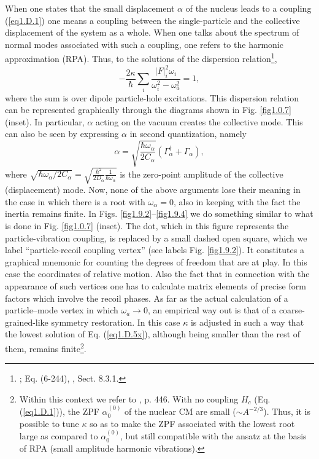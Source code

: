 \begin{subappendices}
When one states that the small displacement 
$\alpha$ of the nucleus leads to a coupling (\ref{eq1.D.1}) one means a coupling between the
single-particle and the collective displacement of the system as a whole. When one talks about the spectrum of normal modes 
associated  with such a coupling, one refers to the harmonic approximation (RPA). Thus, to the solutions of the dispersion relation\footnote{\cite{Bohr:75}; Eq. (6-244), \cite{Brink:05}, Sect. 8.3.1.},
\begin{equation}\label{eq1.D.5x}
- \frac{2 \kappa}{\hbar} \sum_i \frac{|F|_i^2 \omega_i}{\omega_i^2 - \omega_a^2} = 1,
\end{equation}
where the sum is over  dipole particle-hole excitations. This dispersion relation can be represented graphically 
through the diagrams shown in Fig. \ref{fig1.0.7} (inset). In particular, 
$\alpha$ acting on the vacuum creates the collective mode. This can also be seen by expressing $\alpha$ in second quantization, namely
\begin{equation}
\alpha = \sqrt { \frac{\hbar \omega_{\alpha}}{2C_{\alpha}} }
 (\Gamma_{\alpha}^{\dagger} + \Gamma_{\alpha}),
  \end{equation}
  where $\sqrt{ \hbar \omega_{\alpha}/2 C_{\alpha}} = \sqrt{\frac{\hbar^2}{2D_{\alpha} }\frac{1}{\hbar \omega_{\alpha}}}$ is the zero-point amplitude
of the collective (displacement) mode. 
Now, none of the above arguments lose their meaning  in the case in which there is a root with $\omega_{\alpha}= 0$, 
also in keeping  with the fact the  inertia remains finite. 
In Figs. \ref{fig1.9.2}--\ref{fig1.9.4} we do something   similar to what is done in Fig. \ref{fig1.0.7} (inset). The dot, which in this figure represents the particle-vibration coupling, is 
replaced by a small dashed open square, which we  label ``particle-recoil coupling vertex'' (see labels Fig. \ref{fig1.9.2}). It constitutes a graphical mnemonic 
for counting  the degrees of freedom that are at play. In this case the coordinates of relative motion. Also the fact that in connection with the appearance of 
such vertices one has to calculate matrix elements of precise form factors which involve the recoil phases. As far as the actual calculation of a particle--mode vertex in which $\omega_a\rightarrow 0$, an empirical
way out is that of a coarse-grained-like symmetry restoration.
In this case $\kappa$ is adjusted in such a way that the lowest solution of Eq. (\ref{eq1.D.5x}), although
being smaller than the  rest of them, remains finite\footnote{Within this context we refer to \cite{Bohr:75}, p. 446. With no coupling $H_c$ (Eq. (\ref{eq1.D.1})), the  ZPF $\alpha^{(0)}_0$ of the nuclear CM are small ($\sim A^{-2/3}$). Thus, it is possible to tune $\kappa$ so as to make the ZPF associated with the lowest root large as compared to $\alpha^{(0)}_0$, but still compatible with the ansatz at the basis of RPA (small amplitude harmonic vibrations).}.


\end{subappendices}
